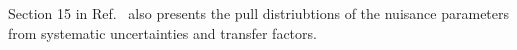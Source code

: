 %
%


Section 15 in Ref.~\cite{alphaTnote} also presents the pull distriubtions of the nuisance parameters from systematic uncertainties and transfer factors.
